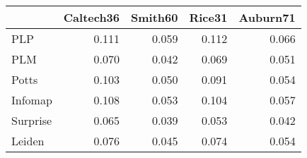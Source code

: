 \begin{tabular}{lrrrr}
\toprule
{} & Caltech36 & Smith60 & Rice31 & Auburn71 \\
\midrule
PLP      &     0.111 &   0.059 &  0.112 &    0.066 \\
PLM      &     0.070 &   0.042 &  0.069 &    0.051 \\
Potts    &     0.103 &   0.050 &  0.091 &    0.054 \\
Infomap  &     0.108 &   0.053 &  0.104 &    0.057 \\
Surprise &     0.065 &   0.039 &  0.053 &    0.042 \\
Leiden   &     0.076 &   0.045 &  0.074 &    0.054 \\
\bottomrule
\end{tabular}
